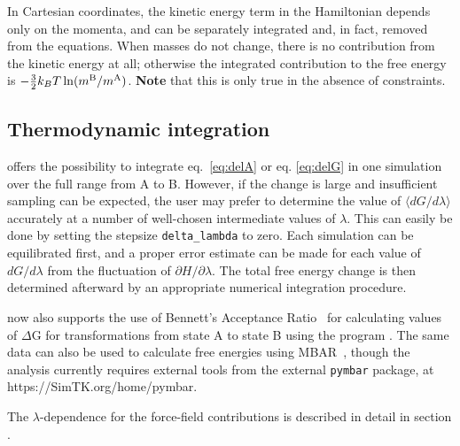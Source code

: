 In Cartesian coordinates, the kinetic energy term in the Hamiltonian
depends only on the momenta, and can be separately integrated and, in
fact, removed from the equations. When masses do not change, there is
no contribution from the kinetic energy at all; otherwise the
integrated contribution to the free energy is $-\frac{3}{2} k_BT \ln
(m\sB/m\sA)$. {\bf Note} that this is only true in the absence of constraints.

\subsection{Thermodynamic integration}  
{\gromacs} offers the possibility to integrate eq.~\ref{eq:delA} or
eq. \ref{eq:delG} in one simulation over the full range from A to
B. However, if the change is large and insufficient sampling can be
expected, the user may prefer to determine the value of $\langle
dG/d\lambda \rangle$ accurately at a number of well-chosen
intermediate values of $\lambda$. This can easily be done by setting
the stepsize {\tt delta_lambda} to zero. Each simulation can be
equilibrated first, and a proper error estimate can be made for each
value of $dG/d\lambda$ from the fluctuation of $\partial H/\partial
\lambda$. The total free energy change is then determined afterward
by an appropriate numerical integration procedure.

{\gromacs} now also supports the use of Bennett's Acceptance Ratio~\cite{Bennett1976}
for calculating values of $\Delta$G for transformations from state A to state B using
the program {\tt {}}. The same data can also be used to calculate free
energies using MBAR~\cite{Shirts2008}, though the analysis currently requires external tools from
the external {\tt pymbar} package, at https://SimTK.org/home/pymbar.

The $\lambda$-dependence for the force-field contributions is
described in detail in section .


